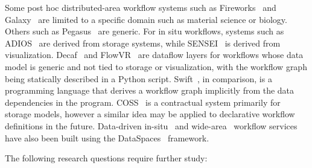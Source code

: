 \begin{refsection}
\noindent
Some post hoc distributed-area workflow systems such as Fireworks~\cite{Jain15} and Galaxy~\cite{Afgan11} are limited to a specific domain such as material science or biology. Others such as Pegasus~\cite{Deelman15} are generic. For in situ workflows, systems such as ADIOS~\cite{Boyuka14} are derived from storage systems, while SENSEI~\cite{Ayachit16} is derived from visualization. Decaf~\cite{Dreher17} and FlowVR~\cite{Dreher14} are dataflow layers for workflows whose data model is generic and not tied to storage or visualization, with the workflow graph being statically described in a Python script. Swift~\cite{Wozniak13}, in comparison, is a programming language that derives a workflow graph implicitly from the data dependencies in the program. COSS~\cite{Dorier17} is a contractual system primarily for storage models, however a similar idea may be applied to declarative workflow definitions in the future.
Data-driven in-situ~\cite{wang2018report} and wide-area~\cite{aktas2017wa} workflow services have also been built using the DataSpaces~\cite{Docan2012} framework.



The following research questions require further study:


\end{refsection}
